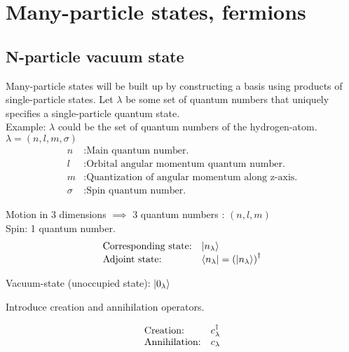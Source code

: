 
\usetikzlibrary{positioning}
\tikzset{>=stealth}

\newcommand{\tikzmark}[3][]{\tikz[remember picture,baseline] \node [anchor=base,#1](#2) {$#3$};}

\section{Many-particle states, fermions}

\subsection{N-particle vacuum state}



Many-particle states will be built up by constructing a basis using products of single-particle states. 
Let $\lambda$ be some set of quantum numbers that uniquely specifies a single-particle quantum state.\\

\noindent Example: $\lambda$ could be the set of quantum numbers of the hydrogen-atom.\\
$\lambda = (n,l,m, \sigma)$\\
\begin{align*}
	n &: \text{Main quantum number.}\\
	l &: \text{Orbital angular momentum quantum number.}\\
	m &: \text{Quantization of angular momentum along z-axis.}\\ 
	\sigma &: \text{Spin quantum number.}
\end{align*}

\noindent Motion in 3 dimensions $\implies$ 3 quantum numbers : $(n,l,m)$\\
Spin: 1 quantum number.\\

\[ \begin{array}{ll}
\mbox{Corresponding state:} & \ket{n_\lambda}\\
\mbox{Adjoint state:} &  \bra{n_\lambda} = \left(\ket{n_\lambda} \right)^\dagger
\end{array}\] 



\noindent Vacuum-state (unoccupied state): $\ket{0_\lambda}$

\noindent Introduce creation and annihilation operators.

\[ \begin{array}{ll}
\mbox{Creation:} & c^{\dagger}_\lambda\\
\mbox{Annihilation:} & c_\lambda
\end{array}\] 

